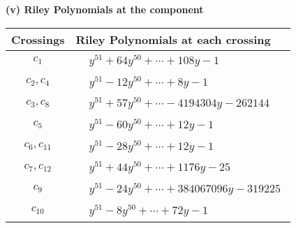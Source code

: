 \documentclass[1p]{elsarticle_modified}
\theoremstyle{definition}
\begin{document}
\newpage\renewcommand{\arraystretch}{1}
\flushleft \textbf{(v) Riley Polynomials at the component}\newline \\
\begin{tabular}{m{50pt}|m{274pt}}
Crossings & \hspace{64pt}Riley Polynomials at each crossing \\
\hline $$\begin{aligned}c_{1}\end{aligned}$$&$\begin{aligned}
&y^{51}+64 y^{50}+\cdots+108 y-1
\end{aligned}$\\
\hline $$\begin{aligned}c_{2},c_{4}\end{aligned}$$&$\begin{aligned}
&y^{51}-12 y^{50}+\cdots+8 y-1
\end{aligned}$\\
\hline $$\begin{aligned}c_{3},c_{8}\end{aligned}$$&$\begin{aligned}
&y^{51}+57 y^{50}+\cdots-4194304 y-262144
\end{aligned}$\\
\hline $$\begin{aligned}c_{5}\end{aligned}$$&$\begin{aligned}
&y^{51}-60 y^{50}+\cdots+12 y-1
\end{aligned}$\\
\hline $$\begin{aligned}c_{6},c_{11}\end{aligned}$$&$\begin{aligned}
&y^{51}-28 y^{50}+\cdots+12 y-1
\end{aligned}$\\
\hline $$\begin{aligned}c_{7},c_{12}\end{aligned}$$&$\begin{aligned}
&y^{51}+44 y^{50}+\cdots+1176 y-25
\end{aligned}$\\
\hline $$\begin{aligned}c_{9}\end{aligned}$$&$\begin{aligned}
&y^{51}-24 y^{50}+\cdots+384067096 y-319225
\end{aligned}$\\
\hline $$\begin{aligned}c_{10}\end{aligned}$$&$\begin{aligned}
&y^{51}-8 y^{50}+\cdots+72 y-1
\end{aligned}$\\
\hline
\end{tabular}\\~\\
\end{document}
